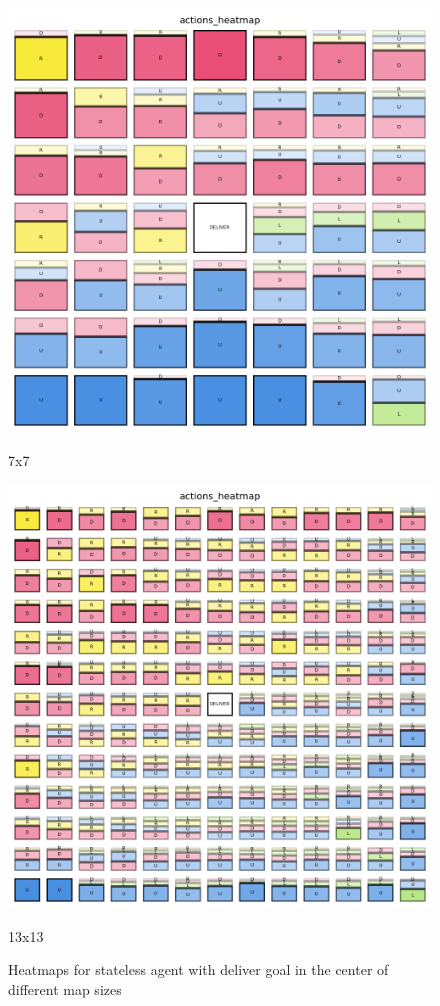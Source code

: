 \begin{figure}[h!]
\begin{minipage}[b]{0.32\textwidth}
    \includegraphics[width=\textwidth]{
      images/results_discussion/stateless/hm_7x7_deliver.png
    }
    \caption{7x7}
    \label{fig:hm_7x7_deliver}
  \end{minipage}
  \hfill
  \begin{minipage}[b]{0.32\textwidth}
    \centering
    \includegraphics[width=\textwidth]{
      images/results_discussion/stateless/hm_13x13_deliver.png
    }
    \caption{13x13}
    \label{fig:hm_13x13_deliver}
  \end{minipage}
  \caption{Heatmaps for stateless agent with deliver goal in the center of
  different map sizes}
  \label{fig:stateless_deliver_heatmaps}
\end{figure}
\vspace{5mm}

